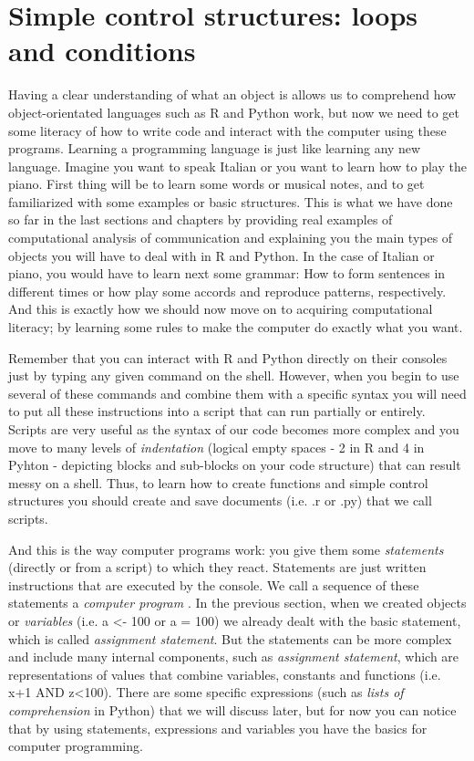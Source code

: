 \section{Simple control structures: loops and conditions}	

Having a clear understanding of what an object is allows us to comprehend how object-orientated languages such as R and Python work, but now we need to get some literacy of how to write code and interact with the computer using these programs. Learning a programming language is just like learning any new language.  Imagine you want to speak Italian or you want to learn how to play the piano. First thing will be to learn some words or musical notes, and to get familiarized with some examples or basic structures. This is what we have done so far in the last sections and chapters by providing real examples of computational analysis of communication and explaining you the main types of objects you will have to deal with in R and Python. In the case of Italian or piano, you would have to learn next some grammar: How to form sentences in different times or how play some accords and reproduce patterns, respectively. And this is exactly how we should now move on to acquiring computational literacy; by learning some rules to make the computer do exactly  what you want.

Remember that you can interact with R and Python directly on their consoles just by typing any given command on the shell. However, when you begin to use several of these commands and combine them with a specific syntax you will need to put all these instructions into a script that can run partially or entirely. Scripts are very useful as the syntax of our code becomes more complex and you move to many levels of \emph{indentation} (logical empty spaces - 2 in R and 4 in Pyhton - depicting blocks and sub-blocks on your code structure) that can result messy on a shell. Thus, to learn how to create functions and simple control structures you should create and save documents (i.e. .r or .py) that we call scripts. 

And this is the way computer programs work: you give them some \emph{statements} (directly or from a script) to which they react. Statements are just written instructions that are executed by the console.  We call a sequence of these statements a \emph{computer program} . In the previous section, when we created objects or \emph{variables} (i.e. a \textless- 100 or a = 100) we already dealt with the basic statement, which is called \emph{assignment statement}. But the statements can be more complex and include many internal components, such as \emph{assignment statement}, which are representations of values that combine variables, constants and functions (i.e.  x+1 AND z\textless100). There are some specific expressions (such as \emph{lists of comprehension} in Python) that we will discuss later, but for now you can notice that by using statements, expressions and variables you have the basics for computer programming.

